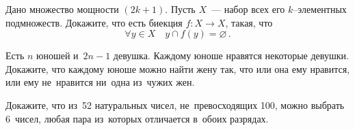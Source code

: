 \begin{problems}
\item
Дано множество мощности $(2 k + 1)$.
Пусть $X$~--- набор всех его $k$--элементных подмножеств.
Докажите, что есть биекция $f \colon X \to X$, такая, что
\[
    \forall y \in X
\quad
    y \cap f(y) = \varnothing
\,.\]

\item
Есть $n$ юношей и~$2 n - 1$ девушка.
Каждому юноше нравятся некоторые девушки.
Докажите, что каждому юноше можно найти жену так, что или она ему нравится, или
ему не~нравится ни~одна из~чужих жен.

\item
Докажите, что из~52 натуральных чисел, не~превосходящих 100, можно выбрать
6~чисел, любая пара из~которых отличается в~обоих разрядах.

\end{problems}

\endgroup %

